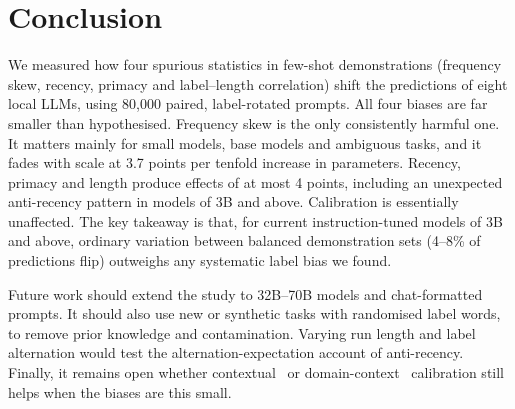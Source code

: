 \section{Conclusion}
\label{sec:conclusion}

We measured how four spurious statistics in few-shot demonstrations (frequency skew, recency, primacy and label--length correlation) shift the predictions of eight local LLMs, using 80,000 paired, label-rotated prompts. All four biases are far smaller than hypothesised. Frequency skew is the only consistently harmful one. It matters mainly for small models, base models and ambiguous tasks, and it fades with scale at 3.7 points per tenfold increase in parameters. Recency, primacy and length produce effects of at most 4 points, including an unexpected anti-recency pattern in models of 3B and above. Calibration is essentially unaffected. The key takeaway is that, for current instruction-tuned models of 3B and above, ordinary variation between balanced demonstration sets (4--8\% of predictions flip) outweighs any systematic label bias we found.

Future work should extend the study to 32B--70B models and chat-formatted prompts. It should also use new or synthetic tasks with randomised label words, to remove prior knowledge and contamination. Varying run length and label alternation would test the alternation-expectation account of anti-recency. Finally, it remains open whether contextual~\citep{zhao2021calibrate} or domain-context~\citep{fei2023mitigating} calibration still helps when the biases are this small.
